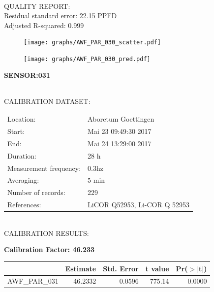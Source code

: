 \documentclass[oneside]{report}
\begin{document}
\hrulefill\\
QUALITY REPORT:\\
Residual standard error: 22.15 PPFD\\
Adjusted R-squared: 0.999



\begin{figure}[H]
  \centering
  \texttt{[image: graphs/AWF\_PAR\_030\_scatter.pdf]}
\end{figure}




\begin{figure}[H]
  \centering
  \texttt{[image: graphs/AWF\_PAR\_030\_pred.pdf]}
\end{figure}

\pagebreak


\begin{center}
\large{\textbf{SENSOR:031}}\\
\end{center}

\hrulefill\\
CALIBRATION DATASET:\\
\begin{table}[h!]
  \centering
  \label{tab:table1}
  \begin{tabular}{ll}
    Location: & Aboretum Goettingen\\ 
    
    
    Start:  & Mai 23 09:49:30 2017 \\
    End:   & Mai 24 13:29:00 2017\\ 
    Duration: & 28 h\\
    Measurement frequency: & 0.3hz\\
    Averaging:  &5 min\\
    Number of records: & 229 \\
    References: & LiCOR Q52953, Li-COR Q 52953 \\
  \end{tabular}
\end{table}

\hrulefill\\
CALIBRATION RESULTS:\\


\begin{center}
\textbf{\large{Calibration Factor: 46.233}}\\
\end{center}
\begin{table}[ht]
\centering
\begin{tabular}{rrrrr}
  \hline
 & Estimate & Std. Error & t value & Pr($>$$|$t$|$) \\ 
  \hline
AWF\_PAR\_031 & 46.2332 & 0.0596 & 775.14 & 0.0000 \\ 
   \hline
\end{tabular}
\end{table}
\end{document}
